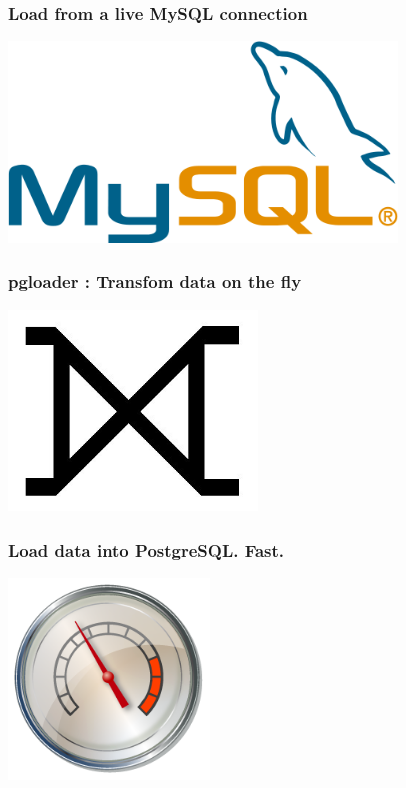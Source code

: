 \documentclass{beamer}
\begin{document}
\begin{frame}
  \frametitle{Load from a live MySQL connection}


  \begin{center}
    \includegraphics[height=2.1in]{mysql.png}
  \end{center}
\end{frame}

\begin{frame}
  \frametitle{pgloader : Transfom data on the fly}


  \begin{center}
    \includegraphics[height=2.1in]{huge-full-outer-join.jpg}
  \end{center}
\end{frame}

\begin{frame}
  \frametitle{Load data into PostgreSQL. Fast.}


  \begin{center}
    \includegraphics[height=2.1in]{performance-index-00.png}
  \end{center}
\end{frame}
\end{document}
